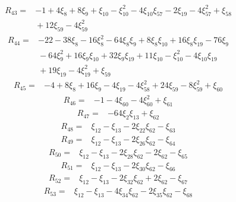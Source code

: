 \[
\begin{aligned}
 R_{43}={}&-1+4\xi_{8}+8\xi_{9}+\xi_{10}-\xi_{10}^{2}-4\xi_{10}\xi_{57}-2\xi_{19}-4\xi_{57}^{2}+\xi_{58}\\
 &{}+12\xi_{59}-4\xi_{59}^{2}
\end{aligned}
\]
\[
\begin{aligned}
 R_{44}={}&-22-38\xi_{8}-16\xi_{8}^{2}-64\xi_{8}\xi_{9}+8\xi_{8}\xi_{10}+16\xi_{8}\xi_{19}-76\xi_{9}\\
 &{}-64\xi_{9}^{2}+16\xi_{9}\xi_{10}+32\xi_{9}\xi_{19}+11\xi_{10}-\xi_{10}^{2}-4\xi_{10}\xi_{19}\\
 &{}+19\xi_{19}-4\xi_{19}^{2}+\xi_{59}
\end{aligned}
\]
\[
\begin{aligned}
 R_{45}={}&-4+8\xi_{8}+16\xi_{9}-4\xi_{19}-4\xi_{58}^{2}+24\xi_{59}-8\xi_{59}^{2}+\xi_{60}
\end{aligned}
\]
\[
\begin{aligned}
 R_{46}={}&-1-4\xi_{60}-4\xi_{60}^{2}+\xi_{61}
\end{aligned}
\]
\[
\begin{aligned}
 R_{47}={}&-64\xi_{2}\xi_{13}+\xi_{62}
\end{aligned}
\]
\[
\begin{aligned}
 R_{48}={}&\xi_{12}-\xi_{13}-2\xi_{22}\xi_{62}-\xi_{63}
\end{aligned}
\]
\[
\begin{aligned}
 R_{49}={}&\xi_{12}-\xi_{13}-2\xi_{26}\xi_{62}-\xi_{64}
\end{aligned}
\]
\[
\begin{aligned}
 R_{50}={}&\xi_{12}-\xi_{13}-2\xi_{28}\xi_{62}-2\xi_{62}-\xi_{65}
\end{aligned}
\]
\[
\begin{aligned}
 R_{51}={}&\xi_{12}-\xi_{13}-2\xi_{30}\xi_{62}-\xi_{66}
\end{aligned}
\]
\[
\begin{aligned}
 R_{52}={}&\xi_{12}-\xi_{13}-2\xi_{32}\xi_{62}+2\xi_{62}-\xi_{67}
\end{aligned}
\]
\[
\begin{aligned}
 R_{53}={}&\xi_{12}-\xi_{13}-4\xi_{34}\xi_{62}-2\xi_{35}\xi_{62}-\xi_{68}
\end{aligned}
\]
